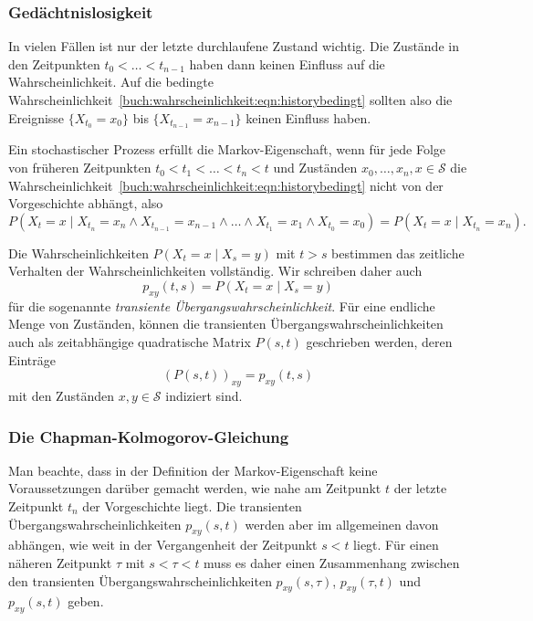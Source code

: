 \subsubsection{Gedächtnislosigkeit}
%
In vielen Fällen ist nur der letzte durchlaufene Zustand wichtig.
Die Zustände in den Zeitpunkten $t_0<\dots<t_{n-1}$ haben dann keinen
Einfluss auf die Wahrscheinlichkeit.
Auf die bedingte
Wahrscheinlichkeit~\eqref{buch:wahrscheinlichkeit:eqn:historybedingt}
sollten also die Ereignisse $\{X_{t_0}=x_0\}$ bis $\{X_{t_{n-1}}=x_{n-1}\}$
keinen Einfluss haben.

\begin{definition}
Ein stochastischer Prozess erfüllt die Markov-Eigenschaft, wenn 
für jede Folge von früheren Zeitpunkten $t_0<t_1<\dots <t_n<t$ und Zuständen
$x_0,\dots,x_n,x\in \mathcal{S}$ die 
Wahrscheinlichkeit~\eqref{buch:wahrscheinlichkeit:eqn:historybedingt}
nicht von der Vorgeschichte abhängt, also
\[
P(X_t = x\mid
X_{t_n}=x_n\wedge X_{t_{n-1}}=x_{n-1}\wedge\dots\wedge X_{t_1}=x_1\wedge
X_{t_0}=x_0)
=
P(X_t = x \mid
X_{t_n}=x_n).
\]
\end{definition}

Die Wahrscheinlichkeiten $P(X_t=x\mid X_s=y)$ mit $t>s$ bestimmen das
zeitliche Verhalten der Wahrscheinlichkeiten vollständig.
Wir schreiben daher auch
\[
p_{xy}(t, s)
=
P(X_t = x\mid X_s=y)
\]
für die sogenannte {\em transiente Übergangswahrscheinlichkeit}.
%
Für eine endliche Menge von Zuständen, können die transienten
Übergangswahrscheinlichkeiten auch als zeitabhängige 
quadratische Matrix $P(s,t)$ geschrieben werden, deren
Einträge
\[
(P(s,t))_{xy}
=
p_{xy}(t,s)
\]
mit den Zuständen $x,y\in\mathcal{S}$ indiziert sind.

\subsubsection{Die Chapman-Kolmogorov-Gleichung}
%
Man beachte, dass in der Definition der Markov-Eigenschaft
keine Voraussetzungen darüber gemacht werden, wie nahe
am Zeitpunkt $t$ der letzte Zeitpunkt $t_n$ der Vorgeschichte liegt.
Die transienten Übergangswahrscheinlichkeiten $p_{xy}(s,t)$ werden
aber im allgemeinen davon abhängen, wie weit in der Vergangenheit
der Zeitpunkt $s<t$ liegt.
Für einen näheren Zeitpunkt $\tau$ mit $s<\tau <t$ muss es daher
einen Zusammenhang zwischen den transienten Übergangswahrscheinlichkeiten
$p_{xy}(s,\tau)$, $p_{xy}(\tau,t)$ und $p_{xy}(s,t)$ geben.


